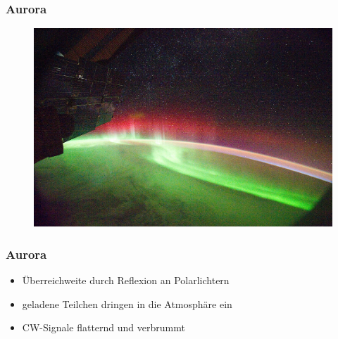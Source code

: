 \begin{frame}
    \frametitle{Aurora}
	\begin{center}
        \begin{figure}
      \includegraphics[width=.9\textwidth,height=.75\textheight,keepaspectratio]{e09/Aurora_Seen_From_Space_by_NASA.jpg}
    \end{figure}
    \end{center}
\end{frame}
\begin{frame}
  \frametitle{Aurora}
  \begin{itemize}
    \item Überreichweite durch Reflexion an Polarlichtern
    \item geladene Teilchen dringen in die Atmosphäre ein
    \item CW-Signale flatternd und verbrummt
  \end{itemize}  
\end{frame}
